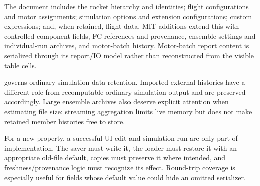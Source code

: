 The document includes the rocket hierarchy and identities; flight configurations and motor assignments; simulation options and extension configurations; custom expressions; and, when retained, flight data. MIT additions extend this with controlled-component fields, FC references and provenance, ensemble settings and individual-run archives, and motor-batch history. Motor-batch report content is serialized through its report/IO model rather than reconstructed from the visible table cells.

 governs ordinary simulation-data retention. Imported external histories have a different role from recomputable ordinary simulation output and are preserved accordingly. Large ensemble archives also deserve explicit attention when estimating file size: streaming aggregation limits live memory but does not make retained member histories free to store.


For a new property, a successful UI edit and simulation run are only part of implementation. The saver must write it, the loader must restore it with an appropriate old-file default, copies must preserve it where intended, and freshness/provenance logic must recognize its effect. Round-trip coverage is especially useful for fields whose default value could hide an omitted serializer.


